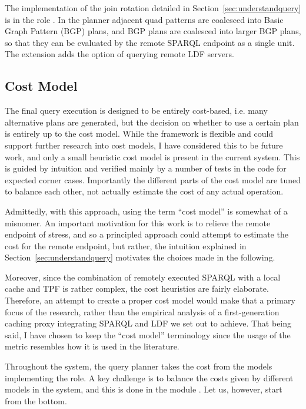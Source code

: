 The implementation of the join rotation detailed in
Section~\ref{sec:understandquery} is in the role
. In the planner
 adjacent quad patterns are
coalesced into Basic Graph Pattern (BGP) plans, and BGP plans are
coalesced into larger BGP plans, so that they can be evaluated by the
remote SPARQL endpoint as a single unit. The extension
 adds the option of
querying remote LDF servers.

\subsection{Cost Model}\label{sec:costheuristics}

The final query execution is designed to be entirely cost-based,
i.e. many alternative plans are generated, but the decision on whether
to use a certain plan is entirely up to the cost model. While the
framework is flexible and could support further research into cost
models, I have considered this to be future work, and only a small
heuristic cost model is present in the current system. This is guided
by intuition and verified mainly by a number of tests in the code for
expected corner cases. Importantly the different parts of the cost
model are tuned to balance each other, not actually estimate the cost
of any actual operation.

Admittedly, with this approach, using the term ``cost model'' is
somewhat of a misnomer. An important motivation for this work is to
relieve the remote endpoint of stress, and so a principled approach
could attempt to estimate the cost for the remote endpoint, but
rather, the intuition explained in Section~\ref{sec:understandquery}
motivates the choices made in the following.

Moreover, since the combination of remotely executed SPARQL with a
local cache and TPF is rather complex, the cost heuristics are fairly
elaborate. Therefore, an attempt to create a proper cost model would
make that a primary focus of the research, rather than the empirical
analysis of a first-generation caching proxy integrating SPARQL and
LDF we set out to achieve. That being said, I have chosen to keep the
``cost model'' terminology since the usage of the metric resembles how
it is used in the literature.

Throughout the system, the query planner takes the cost from the
models implementing the  role. A
key challenge is to balance the costs given by different models in the
system, and this is done in the module
. Let us, however, start
from the bottom. 

